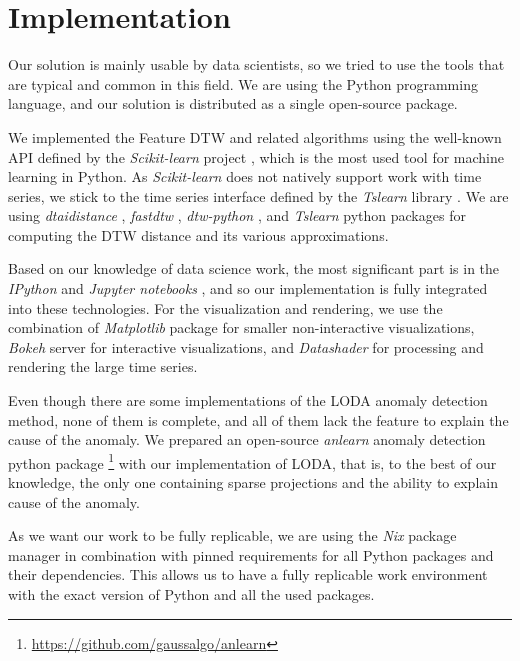 \section{Implementation}
Our solution is mainly usable by data scientists, so we tried to use the tools that are typical and common in this field. We are using the Python programming language, and our solution is distributed as a single open-source package.

We implemented the Feature DTW and related algorithms using the well-known API defined by the \textit{Scikit-learn} project \cite{exp:sklearn_api,exp:scikit-learn}, which is the most used tool for machine learning in Python. As \textit{Scikit-learn} does not natively support work with time series, we stick to the time series interface defined by the \textit{Tslearn} library \cite{exp:tslearn}. We are using \textit{dtaidistance} \cite{exp:dtaid}, \textit{fastdtw} \cite{exp:fast-dtw-pack}, \textit{dtw-python} \cite{exp:dtw-1}, and \textit{Tslearn} \cite{exp:tslearn} python packages for computing the DTW distance and its various approximations.

Based on our knowledge of data science work, the most significant part is in the \textit{IPython} \cite{exp:ipython} and \textit{Jupyter notebooks} \cite{exp:jupyter}, and so our implementation is fully integrated into these technologies. For the visualization and rendering, we use the combination of \textit{Matplotlib} package \cite{exp:matplotlib} for smaller non-interactive visualizations, \textit{Bokeh} server \cite{exp:bokeh} for interactive visualizations, and \textit{Datashader} \cite{vis:datashader} for processing and rendering the large time series.

Even though there are some implementations of the LODA anomaly detection method, none of them is complete, and all of them lack the feature to explain the cause of the anomaly. We prepared an open-source \textit{anlearn} anomaly detection python package \footnote{\url{https://github.com/gaussalgo/anlearn}} with our implementation of LODA, that is, to the best of our knowledge, the only one containing sparse projections and the ability to explain cause of the anomaly.

As we want our work to be fully replicable, we are using the \textit{Nix} package manager \cite{exp:dolstra2008nixos} in combination with pinned requirements for all Python packages and their dependencies. This allows us to have a fully replicable work environment with the exact version of Python and all the used packages.

